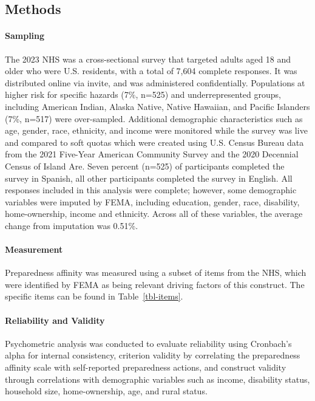 \documentclass[
  letterpaper,
  DIV=11,
  numbers=noendperiod]{scrartcl}
\let\oldparagraph\paragraph
\renewcommand{\paragraph}[1]{\oldparagraph{#1}\mbox{}}
\begin{document}
\subsection{Methods}\label{methods}

\paragraph{Sampling}\label{sampling}

The 2023 NHS was a cross-sectional survey that targeted adults aged 18
and older who were U.S. residents, with a total of 7,604 complete
responses. It was distributed online via invite, and was administered
confidentially. Populations at higher risk for specific hazards (7\%,
n=525) and underrepresented groups, including American Indian, Alaska
Native, Native Hawaiian, and Pacific Islanders (7\%, n=517) were
over-sampled. Additional demographic characteristics such as age,
gender, race, ethnicity, and income were monitored while the survey was
live and compared to soft quotas which were created using U.S. Census
Bureau data from the 2021 Five-Year American Community Survey and the
2020 Decennial Census of Island Are. Seven percent (n=525) of
participants completed the survey in Spanish, all other participants
completed the survey in English. All responses included in this analysis
were complete; however, some demographic variables were imputed by FEMA,
including education, gender, race, disability, home-ownership, income
and ethnicity. Across all of these variables, the average change from
imputation was 0.51\%.

\paragraph{Measurement}\label{measurement}

Preparedness affinity was measured using a subset of items from the NHS,
which were identified by FEMA as being relevant driving factors of this
construct. The specific items can be found in Table~\ref{tbl-items}.

\paragraph{Reliability and Validity}\label{reliability-and-validity}

Psychometric analysis was conducted to evaluate reliability using
Cronbach's alpha for internal consistency, criterion validity by
correlating the preparedness affinity scale with self-reported
preparedness actions, and construct validity through correlations with
demographic variables such as income, disability status, household size,
home-ownership, age, and rural status.
\end{document}
